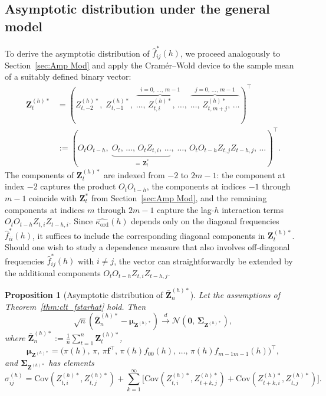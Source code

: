 ﻿\documentclass[12pt,a4paper]{scrreprt}
\newtheorem{proposition}[theorem]{Proposition}
\theoremstyle{definition}
\begin{document}
\subsection{Asymptotic distribution under the general model}
\label{subsec:serial-general}

To derive the asymptotic distribution of $\hat{f}^*_{ij}(h)$, we 
proceed analogously to Section~\ref{sec:Amp Mod} and apply the 
Cramér--Wold device to the sample mean of a suitably defined 
binary vector:
\label{eq:Z^h}
\begin{align*}
    \boldsymbol{Z}^{(h)*}_t 
    &= \left(
        Z_{t,-2}^{(h)*},\;
        Z_{t, -1}^{(h)*},\;
        \overbrace{\ldots,\, Z_{t,i}^{(h)*},\, \ldots}^{i=0,\,\ldots,\,m-1},\;
        \overbrace{\ldots,\, Z_{t,m+j}^{(h)*},\, \ldots}^{j=0,\,\ldots,\,m-1}
       \right)^\top \\
    &:= \left(
        O_t O_{t-h},\;
        \underbrace{O_t,\, \ldots,\, O_{t} Z_{t,i},\, \ldots}_{=\,\boldsymbol{Z}^*_t},\;
        \ldots,\, O_t O_{t-h} Z_{t,j} Z_{t-h,j},\, \ldots
        \right)^\top.
\end{align*}
The components of $\boldsymbol{Z}^{(h)*}_t$ are indexed from $-2$ to 
$2m-1$: the component at index $-2$ captures the product $O_tO_{t-h}$, 
the components at indices $-1$ through $m-1$ coincide with 
$\boldsymbol{Z}_t^*$ from Section~\ref{sec:Amp Mod}, and the remaining 
components at indices $m$ through $2m-1$ capture the lag-$h$ interaction 
terms $O_t O_{t-h}Z_{t,i}Z_{t-h,i}$. Since $\hat{\kappa_{\mathrm{ord}}}(h)$ 
depends only on the diagonal frequencies $\hat{f}^*_{ii}(h)$, it 
suffices to include the corresponding diagonal components in 
$\boldsymbol{Z}_t^{(h)*}$. Should one wish to study a dependence 
measure that also involves off-diagonal frequencies $\hat{f}^*_{ij}(h)$ 
with $i \neq j$, the vector can straightforwardly be extended by the 
additional components $O_t O_{t-h} Z_{t,i} Z_{t-h,j}$.\\
\begin{proposition}[Asymptotic distribution of $\bar{\boldsymbol{Z}}^{(h)*}_n$]\label{prop:clt_zstar_h}
Let the assumptions of Theorem~\ref{thm:clt_fstarhat} hold. Then
\[
    \sqrt{n}\!\left(\bar{\boldsymbol{Z}}^{(h)*}_n - 
    \boldsymbol{\mu}_{\boldsymbol{Z}^{(h)*}}\right) 
    \xrightarrow{d} \mathcal{N}\!\left(\boldsymbol{0},\, 
    \boldsymbol{\Sigma}_{\boldsymbol{Z}^{(h)*}}\right),
\]
where $\bar{\boldsymbol{Z}}^{(h)*}_n := \frac{1}{n}\sum_{t=1}^{n} 
\boldsymbol{Z}^{(h)*}_t$,
\[
    \boldsymbol{\mu}_{\boldsymbol{Z}^{(h)*}} 
    = \bigl(\pi(h),\, \pi,\, \pi\boldsymbol{f}^\top,\, 
      \pi(h)f_{00}(h),\, \ldots,\, 
      \pi(h)f_{m-1m-1}(h)\bigr)^\top,
\]
and $\boldsymbol{\Sigma}_{\boldsymbol{Z}^{(h)*}}$ has elements
\[
    \sigma^{(h)}_{ij} = \mathrm{Cov}(Z^{(h)*}_{t,i}, Z^{(h)*}_{t,j}) 
    + \sum_{k=1}^{\infty}\bigl[
    \mathrm{Cov}(Z^{(h)*}_{t,i}, Z^{(h)*}_{t+k,j}) 
    + \mathrm{Cov}(Z^{(h)*}_{t+k,i}, Z^{(h)*}_{t,j})\bigr].
\]
\end{proposition}
\end{document}
